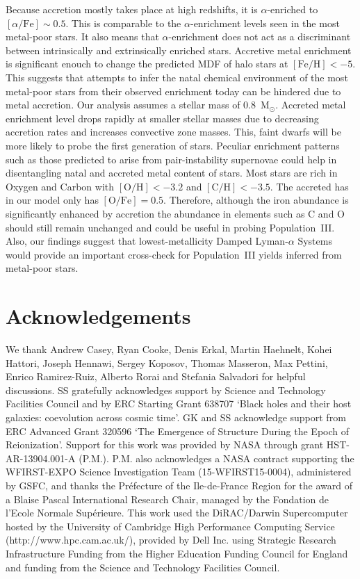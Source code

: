 \documentclass[a4paper,fleqn,usenatbib]{mnras}
\begin{document}
Because accretion mostly takes place at high redshifts, it is
$\alpha$-enriched to $[\alpha/\mathrm{Fe}]\sim 0.5$.  This is
comparable to the $\alpha$-enrichment levels seen in the most
metal-poor stars.  It also means that $\alpha$-enrichment does not act
as a discriminant between intrinsically and extrinsically enriched
stars.  Accretive metal enrichment is significant enouch to change the
predicted MDF of halo stars at $[\mathrm{Fe}/\mathrm{H}]<-5$.  This
suggests that attempts to infer the natal chemical environment of the
most metal-poor stars from their observed enrichment today can be
hindered due to metal accretion.  Our analysis assumes a stellar mass
of 0.8~M$_\odot$.  Accreted metal enrichment level drops rapidly at
smaller stellar masses due to decreasing accretion rates and increases
convective zone masses.  This, faint dwarfs will be more likely to
probe the first generation of stars.  Peculiar enrichment patterns
such as those predicted to arise from pair-instability supernovae
could help in disentangling natal and accreted metal content of stars.
Most stars are rich in Oxygen and Carbon with
$[\mathrm{O}/\mathrm{H}]<-3.2$ and $[\mathrm{C}/\mathrm{H}]<-3.5$.
The accreted has in our model only has $[\mathrm{O}/\mathrm{Fe}]=0.5$.
Therefore, although the iron abundance is significantly enhanced by
accretion the abundance in elements such as C and O should still
remain unchanged and could be useful in probing Population~III.  Also,
our findings suggest that lowest-metallicity Damped Lyman-$\alpha$
Systems \citep{2006A&A...451...19E, 2012MNRAS.421L..29S,
  2012MNRAS.425..347C, 2013ApJ...772...93K} would provide an important
cross-check for Population~III yields inferred from metal-poor stars.

\section*{Acknowledgements}

We thank Andrew Casey, Ryan Cooke, Denis Erkal, Martin Haehnelt, Kohei
Hattori, Joseph Hennawi, Sergey Koposov, Thomas Masseron, Max Pettini,
Enrico Ramirez-Ruiz, Alberto Rorai and Stefania Salvadori for helpful
discussions.  SS gratefully acknowledges support by Science and
Technology Facilities Council and by ERC Starting Grant 638707 `Black
holes and their host galaxies: coevolution across cosmic time'.  GK
and SS acknowledge support from ERC Advanced Grant 320596 `The
Emergence of Structure During the Epoch of Reionization'. Support for
this work was provided by NASA through grant HST-AR-13904.001-A
(P.M.). P.M. also acknowledges a NASA contract supporting the
WFIRST-EXPO Science Investigation Team (15-WFIRST15-0004),
administered by GSFC, and thanks the Pr\'{e}fecture of the
Ile-de-France Region for the award of a Blaise Pascal International
Research Chair, managed by the Fondation de l'Ecole Normale
Sup\'{e}rieure.  This work used the DiRAC/Darwin Supercomputer hosted
by the University of Cambridge High Performance Computing Service
(http://www.hpc.cam.ac.uk/), provided by Dell Inc.  using Strategic
Research Infrastructure Funding from the Higher Education Funding
Council for England and funding from the Science and Technology
Facilities Council.




\bsp
\label{lastpage}
\end{document}
